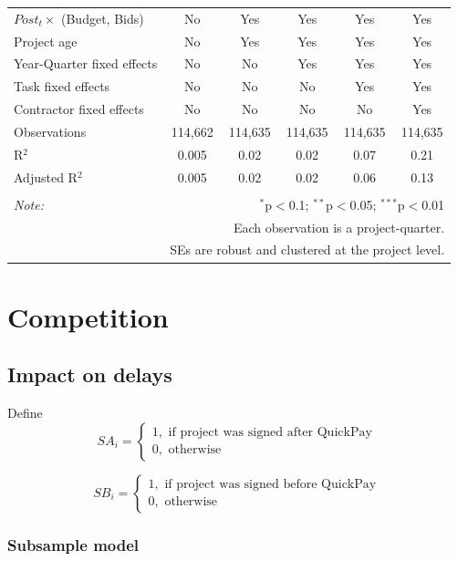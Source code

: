 \documentclass[
]{article}
\begin{document}
\begin{table}[H]
\begin{tabular}{@{\extracolsep{-2pt}}lccccc}
$Post_t \times $  (Budget, Bids) & No & Yes & Yes & Yes & Yes \\ 
Project age & No & Yes & Yes & Yes & Yes \\ 
Year-Quarter fixed effects & No & No & Yes & Yes & Yes \\ 
Task fixed effects & No & No & No & Yes & Yes \\ 
Contractor fixed effects & No & No & No & No & Yes \\ 
Observations & 114,662 & 114,635 & 114,635 & 114,635 & 114,635 \\ 
R$^{2}$ & 0.005 & 0.02 & 0.02 & 0.07 & 0.21 \\ 
Adjusted R$^{2}$ & 0.005 & 0.02 & 0.02 & 0.06 & 0.13 \\ 
\hline 
\hline \\[-1.8ex] 
\textit{Note:}  & \multicolumn{5}{r}{$^{*}$p$<$0.1; $^{**}$p$<$0.05; $^{***}$p$<$0.01} \\ 
 & \multicolumn{5}{r}{Each observation is a project-quarter.} \\ 
 & \multicolumn{5}{r}{SEs are robust and clustered at the project level.} \\ 
\end{tabular} 
\end{table}

\hypertarget{competition}{%
\section{Competition}\label{competition}}

\hypertarget{impact-on-delays}{%
\subsection{Impact on delays}\label{impact-on-delays}}

Define
\[ SA_i = \begin{cases} 1, \text{ if project was signed after QuickPay}\\
0, \text{ otherwise} \end{cases}\]

\[ SB_i = \begin{cases} 1, \text{ if project was signed before QuickPay}\\
0, \text{ otherwise} \end{cases}\]

\hypertarget{subsample-model}{%
\subsubsection{Subsample model}\label{subsample-model}}
\end{document}
